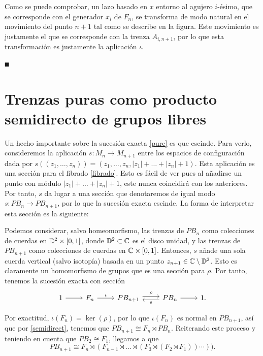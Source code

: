 \documentclass[TFG.tex]{subfiles}
\begin{document}
\begin{dem}
Como se puede comprobar, un lazo basado en $x$ entorno al agujero $i$-ésimo, que se corresponde con el generador $x_i$ de $F_n$, se transforma de modo natural en el movimiento del punto $n+1$ tal como se describe en la figura. Este movimiento es justamente el que se corresponde con la trenza $A_{i,n+1}$, por lo que esta transformación es justamente la aplicación $\iota$. 

$\QED$
\end{dem}






\section{Trenzas puras como producto semidirecto de grupos libres}


Un hecho importante sobre la sucesión exacta \ref{pure} es que escinde. Para verlo, consideremos la aplicación $s:M_n\to M_{n+1}$ entre los espacios de configuración dada por $s((z_1,\dots,z_n))=(z_1,\dots,z_n,|z_1|+\dots+|z_n|+1)$. Esta aplicación es una sección para el fibrado \ref{fibrado}. Esto es fácil de ver pues al añadirse un punto con módulo $|z_1|+\dots+|z_n|+1$, este nunca coincidirá con los anteriores. Por tanto, $s$ da lugar a una sección que denotaremos de igual modo $s:PB_n\to PB_{n+1}$, por lo que la sucesión exacta escinde. La forma de interpretar esta sección es la siguiente:

Podemos considerar, salvo homeomorfismo, las trenzas de $PB_n$ como colecciones de cuerdas en $\mathbb{D}^2\times[0,1]$, donde $\mathbb{D}^2\subset\mathbb{C}$ es el disco unidad, y las trenzas de $PB_{n+1}$ como colecciones de cuerdas en $\mathbb{C}\times[0,1]$. Entonces, $s$ añade una sola cuerda vertical (salvo isotopía) basada en un punto $z_{n+1}\in\mathbb{C}\setminus\mathbb{D}^2$. Esto es claramente un homomorfismo de grupos que es una sección para $\rho$. Por tanto, tenemos la sucesión exacta con sección
\[
\begin{tikzcd}
1\arrow[r]& F_n\arrow[r, "\iota"] & PB_{n+1}\arrow[r,"\rho", shift left]& \arrow[l,"s",shift left]PB_n\arrow[r] & 1.
\end{tikzcd}
\]

Por exactitud, $\iota(F_n)=\ker(\rho)$, por lo que $\iota(F_n)$ es normal en $PB_{n+1}$, así que por \ref{semidirect}, tenemos que $PB_{n+1}\cong F_n\rtimes PB_n$. Reiterando este proceso y teniendo en cuenta que $PB_2\cong F_1$, llegamos a que 
$$PB_{n+1}\cong F_n\rtimes (F_{n-1} \rtimes\dots\rtimes (F_3\rtimes (F_2\rtimes F_1))\cdots)).$$
\end{document}

